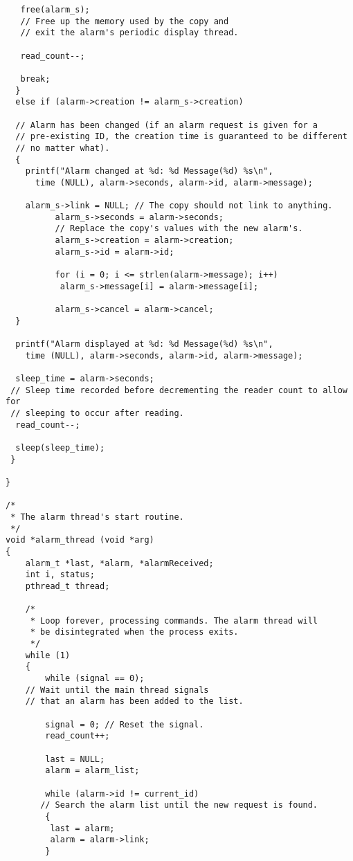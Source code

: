 \documentclass[11pt]{article}
\begin{document}
\begin{lstlisting}
   free(alarm_s); 
   // Free up the memory used by the copy and 
   // exit the alarm's periodic display thread.
   
   read_count--;
   
   break;
  }
  else if (alarm->creation != alarm_s->creation)
    
  // Alarm has been changed (if an alarm request is given for a 
  // pre-existing ID, the creation time is guaranteed to be different 
  // no matter what).
  {  
    printf("Alarm changed at %d: %d Message(%d) %s\n",
      time (NULL), alarm->seconds, alarm->id, alarm->message);
    
    alarm_s->link = NULL; // The copy should not link to anything.
          alarm_s->seconds = alarm->seconds; 
          // Replace the copy's values with the new alarm's.
          alarm_s->creation = alarm->creation;
          alarm_s->id = alarm->id;
        
          for (i = 0; i <= strlen(alarm->message); i++)
           alarm_s->message[i] = alarm->message[i];
          
          alarm_s->cancel = alarm->cancel;
  }
      
  printf("Alarm displayed at %d: %d Message(%d) %s\n",
    time (NULL), alarm->seconds, alarm->id, alarm->message);
    
  sleep_time = alarm->seconds; 
 // Sleep time recorded before decrementing the reader count to allow for 
 // sleeping to occur after reading.
  read_count--;
    
  sleep(sleep_time);
 }
  
}

/*
 * The alarm thread's start routine.
 */
void *alarm_thread (void *arg)
{
    alarm_t *last, *alarm, *alarmReceived;
    int i, status;
    pthread_t thread;

    /*
     * Loop forever, processing commands. The alarm thread will
     * be disintegrated when the process exits.
     */
    while (1)
    { 
        while (signal == 0); 
    // Wait until the main thread signals 
    // that an alarm has been added to the list.
             
        signal = 0; // Reset the signal.
        read_count++;
        
        last = NULL;
        alarm = alarm_list;
        
        while (alarm->id != current_id) 
       // Search the alarm list until the new request is found.
        {
         last = alarm;
         alarm = alarm->link;
        }
        

\end{lstlisting}
\end{document}
